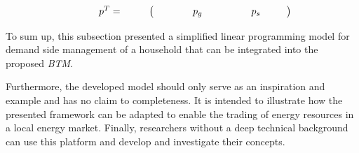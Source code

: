 \begin{equation*}
 \begin{array}{ll@{}ll}
        p^{T} = 
        \begin{pmatrix}
            p_{g} &
            p_{s}
        \end{pmatrix}
 \end{array}
\end{equation*}


To sum up, this subsection presented a simplified linear 
programming model for demand side management of a household
that can be integrated into the proposed \textit{BTM}.

Furthermore, the developed model should only serve as an inspiration and example
and has no claim to completeness. 
It is intended to illustrate how the presented framework can be adapted to enable the trading of energy resources in a local energy market. 
Finally, researchers without a deep technical background can use this platform and
develop and investigate their concepts.

\clearpage